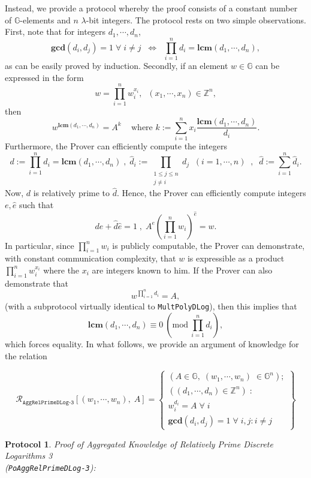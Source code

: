 \documentclass[11pt, lettersize, notitlepage, leqno, footskip=0.6cm]{article}
\newcommand{\bz}{\mathbb Z}
\newcommand{\pl}{\prod\limits}
\newcommand{\slim}{\sum\limits}
\newcommand{\ttt}{\texttt}
\newcommand{\LRA}{\Longleftrightarrow}
\newcommand{\mc}{\mathcal}
\newcommand{\mb}{\mathbb}
\newcommand{\mbf}{\mathbf}
\newcommand{\lam}{\lambda}
\newcommand{\what}{\widehat}
\newcommand{\vs}{\vspace{-0.15cm}}
\newcommand{\Mod}[1]{\ (\mathrm{mod}\ #1)}
\newcommand{\LCM}{\mbf{lcm}}
\newcommand{\GCD}{\mbf{gcd}}
\newtheorem{Prot}[Thm]{Protocol}
\numberwithin{equation}{section}
\begin{document}
Instead, we provide a protocol whereby the proof consists of a constant number of $\mb{G}$-elements and $n$ $\lam$-bit integers. The protocol rests on two simple observations. First, note that for integers $d_1,\cdots,d_n$, \vs $$\GCD(d_i,d_j)=1\;\forall\;i\neq j\;\; \LRA\;\; \pl_{i=1}^n d_i= \LCM(d_1,\cdots,d_n),$$ as can be easily proved by induction. Secondly, if an element $w\in \mb{G}$ can be expressed in the form \vspace{-0.15cm}$$w = \prod\limits_{i=1}^n w_i^{x_i},\;\;(x_1,\cdots,x_n)\in\bz^n,$$ then \vs $$w^{\LCM(d_1,\cdots,d_n)} = A^{k} \;\;\;\text{ where } k := \slim_{i=1}^n x_i\frac{\LCM(d_1,\cdots,d_n)}{d_i}.$$ Furthermore, the Prover can efficiently compute the integers \vs $$d:= \pl_{i=1}^n d_i = \LCM(d_1,\cdots,d_n)\;,\;\what{d}_i:= \pl_{\substack{1\leq j\leq n\\ j\neq i}} d_j\;\; (i=1,\cdots,n)\;\;,\;\; \what{d} := \slim_{i=1}^n \what{d}_i.$$ Now, $d$ is relatively prime to $\what{d}$. Hence, the Prover can efficiently compute integers $e,\what{e}$ such that $$de+\what{d}\what{e} = 1\;,\; A^e(\pl_{i=1}^n w_i)^{\what{e}} = w.  $$ In particular, since $\pl_{i=1}^n w_i$ is publicly computable, the Prover can demonstrate, with constant communication complexity, that $w$ is expressible as a product $\pl_{i=1}^n w_i^{x_i}$ where the $x_i$ are integers known to him. If the Prover can also demonstrate that $$w^{\prod\limits_{i=1}^n d_i} = A,$$ (with a subprotocol virtually identical to \verb|MultPolyDLog|), then this implies that \vspace{-0.15cm}$$\LCM(d_1,\cdots,d_n)\equiv 0\Mod{ \prod\limits_{i=1}^n d_i},$$ which forces equality. In what follows, we provide an argument of knowledge for the relation 

\[
  \mc{R}_{\ttt{AggRelPrimeDLog-3}}[(w_1,\cdots, w_n),\; A] = \left\{\begin{array}{l}
    (A\in\mb{G},\; (w_1,\cdots, w_n)\;\in\mb{G}^n);\\
    ((d_1,\cdots,d_n)\in\bz^n)\;: \\
    w_i^{d_i} = A\;\forall\;i\\
   	\GCD(d_i, d_j) = 1\;\forall \;i,j: i\neq j
  \end{array}\right\}
\] 

\vspace{0.2cm}



\begin{Prot} \normalfont \textit{Proof of Aggregated Knowledge of Relatively Prime Discrete Logarithms} 3\\ (\verb|PoAggRelPrimeDLog-3|):\end{Prot} \vspace{-0.3cm}
\end{document}
